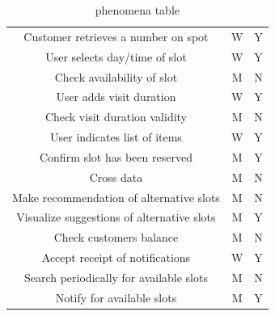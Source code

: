 \documentclass[table, 12pt]{article}
\begin{document}
\begin{center}
\begin{table}
\begin{tabular}{|c|c|c|}
            Customer retrieves a number on spot        & W                & Y          \\
            User selects day/time of slot              & W                & Y          \\
            Check availability of slot                 & M                & N          \\
            User adds visit duration                   & W                & Y          \\
            Check visit duration validity              & M                & N          \\
            User indicates list of items               & W                & Y          \\
            Confirm slot has been reserved             & M                & Y          \\
            Cross data                                 & M                & N          \\
            Make recommendation of alternative slots   & M                & N          \\
            Visualize suggestions of alternative slots & M                & Y          \\
            Check customers balance                    & M                & N          \\
            Accept receipt of notifications            & W                & Y          \\
            Search periodically for available slots    & M                & N          \\
            Notify for available slots                 & M                & Y          \\

            \hline
        \end{tabular}
        \caption{phenomena table}
    \end{table}
\end{center}
\newpage
\end{document}

